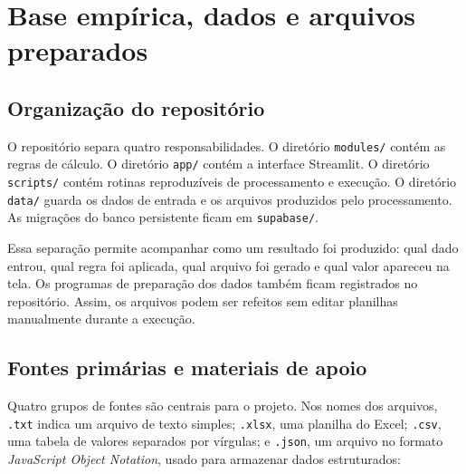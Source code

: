 \documentclass[12pt,a4paper]{report}
\begin{document}
\chapter{Base empírica, dados e arquivos preparados}
\label{chap:base}

\section{Organização do repositório}

O repositório separa quatro responsabilidades. O diretório \texttt{modules/} contém as regras de cálculo. O diretório \texttt{app/} contém a interface Streamlit. O diretório \texttt{scripts/} contém rotinas reproduzíveis de processamento e execução. O diretório \texttt{data/} guarda os dados de entrada e os arquivos produzidos pelo processamento. As migrações do banco persistente ficam em \texttt{supabase/}.

Essa separação permite acompanhar como um resultado foi produzido: qual dado entrou, qual regra foi aplicada, qual arquivo foi gerado e qual valor apareceu na tela. Os programas de preparação dos dados também ficam registrados no repositório. Assim, os arquivos podem ser refeitos sem editar planilhas manualmente durante a execução.

\section{Fontes primárias e materiais de apoio}

Quatro grupos de fontes são centrais para o projeto. Nos nomes dos arquivos, \texttt{.txt} indica um arquivo de texto simples; \texttt{.xlsx}, uma planilha do Excel; \texttt{.csv}, uma tabela de valores separados por vírgulas; e \texttt{.json}, um arquivo no formato \emph{JavaScript Object Notation}, usado para armazenar dados estruturados:
\end{document}

